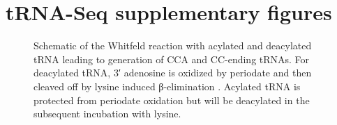 \chapter{tRNA-Seq supplementary figures}


\begin{figure}[ht]
    \centering
    \caption[Whitfeld reaction scheme.]{
    Schematic of the Whitfeld reaction with acylated and deacylated tRNA leading to generation of CCA and CC-ending tRNAs.
    For deacylated tRNA, 3′ adenosine is oxidized by periodate and then cleaved off by lysine induced β-elimination \cite{Rammler1971-mt, uziel1973periodate}.
    Acylated tRNA is protected from periodate oxidation but will be deacylated in the subsequent incubation with lysine.
    }
    \label{ch5:figsupp:f1S1}
\end{figure}


